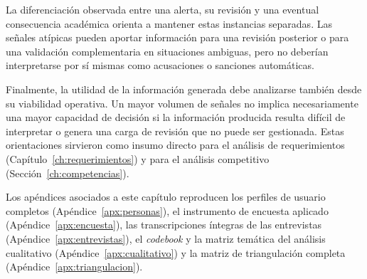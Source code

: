 La diferenciación observada entre una alerta, su revisión y una eventual consecuencia académica orienta a mantener estas instancias separadas. Las señales atípicas pueden aportar información para una revisión posterior o para una validación complementaria en situaciones ambiguas, pero no deberían interpretarse por sí mismas como acusaciones o sanciones automáticas.

Finalmente, la utilidad de la información generada debe analizarse también desde su viabilidad operativa. Un mayor volumen de señales no implica necesariamente una mayor capacidad de decisión si la información producida resulta difícil de interpretar o genera una carga de revisión que no puede ser gestionada. Estas orientaciones sirvieron como insumo directo para el análisis de requerimientos (Capítulo~\ref{ch:requerimientos}) y para el análisis competitivo (Sección~\ref{ch:competencias}).

Los apéndices asociados a este capítulo reproducen los perfiles de usuario completos (Apéndice~\ref{apx:personas}), el instrumento de encuesta aplicado (Apéndice~\ref{apx:encuesta}), las transcripciones íntegras de las entrevistas (Apéndice~\ref{apx:entrevistas}), el \textit{codebook} y la matriz temática del análisis cualitativo (Apéndice~\ref{apx:cualitativo}) y la matriz de triangulación completa (Apéndice~\ref{apx:triangulacion}).
